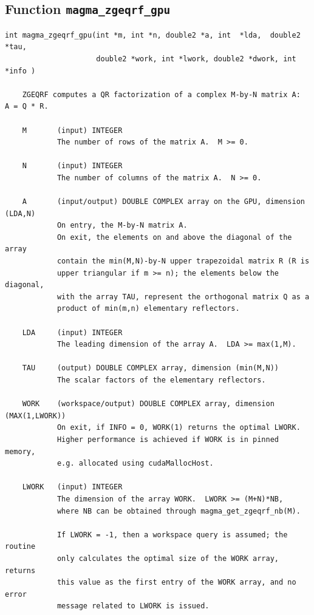 \documentclass[10pt]{book}
\begin{document}
\newpage
\subsection{Function {\tt {\bf magma\_zgeqrf\_gpu}}}
\begin{verbatim}
int magma_zgeqrf_gpu(int *m, int *n, double2 *a, int  *lda,  double2  *tau,
                     double2 *work, int *lwork, double2 *dwork, int *info )
   
    ZGEQRF computes a QR factorization of a complex M-by-N matrix A:  A = Q * R.   

    M       (input) INTEGER   
            The number of rows of the matrix A.  M >= 0.   

    N       (input) INTEGER   
            The number of columns of the matrix A.  N >= 0.   

    A       (input/output) DOUBLE COMPLEX array on the GPU, dimension (LDA,N)   
            On entry, the M-by-N matrix A.   
            On exit, the elements on and above the diagonal of the array   
            contain the min(M,N)-by-N upper trapezoidal matrix R (R is   
            upper triangular if m >= n); the elements below the diagonal,   
            with the array TAU, represent the orthogonal matrix Q as a   
            product of min(m,n) elementary reflectors.

    LDA     (input) INTEGER   
            The leading dimension of the array A.  LDA >= max(1,M).   

    TAU     (output) DOUBLE COMPLEX array, dimension (min(M,N))   
            The scalar factors of the elementary reflectors.   

    WORK    (workspace/output) DOUBLE COMPLEX array, dimension (MAX(1,LWORK))   
            On exit, if INFO = 0, WORK(1) returns the optimal LWORK.   
            Higher performance is achieved if WORK is in pinned memory, 
            e.g. allocated using cudaMallocHost.

    LWORK   (input) INTEGER   
            The dimension of the array WORK.  LWORK >= (M+N)*NB,   
            where NB can be obtained through magma_get_zgeqrf_nb(M).

            If LWORK = -1, then a workspace query is assumed; the routine   
            only calculates the optimal size of the WORK array, returns   
            this value as the first entry of the WORK array, and no error   
            message related to LWORK is issued.   


\end{verbatim}
\end{document}
